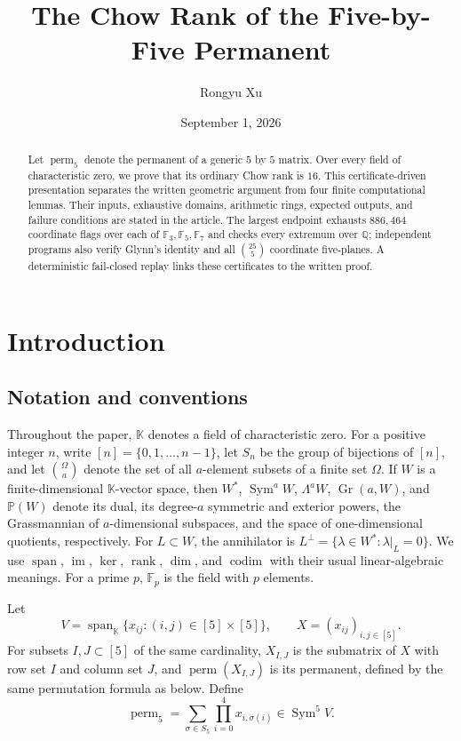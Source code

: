 \documentclass[11pt,reqno]{amsart}
\title{The Chow Rank of the Five-by-Five Permanent}
\author{Rongyu Xu}
\date{September 1, 2026}
\theoremstyle{definition}
\newcommand{\K}{\mathbb K}
\newcommand{\Q}{\mathbb Q}
\newcommand{\F}{\mathbb F}
\newcommand{\Sym}{\operatorname{Sym}}
\newcommand{\rank}{\operatorname{rank}}
\newcommand{\im}{\operatorname{im}}
\newcommand{\Span}{\operatorname{span}}
\newcommand{\perm}{\operatorname{perm}}
\newcommand{\Gr}{\operatorname{Gr}}
\begin{document}
\begin{abstract}
Let \(\perm_5\) denote the permanent of a generic \(5\) by \(5\) matrix.
Over every field of characteristic zero, we prove that its ordinary Chow rank
is \(16\). This certificate-driven presentation separates the written
geometric argument from four finite computational lemmas. Their inputs,
exhaustive domains, arithmetic rings, expected outputs, and failure conditions
are stated in the article. The largest endpoint exhausts \(886{,}464\)
coordinate flags over each of \(\F_3,\F_5,\F_7\) and checks every extremum over
\(\Q\); independent programs also verify Glynn's identity and all
\(\binom{25}{5}\) coordinate five-planes. A deterministic fail-closed replay
links these certificates to the written proof.
\end{abstract}

\maketitle

\section{Introduction}

\subsection*{Notation and conventions}

Throughout the paper, \(\K\) denotes a field of characteristic zero. For a
positive integer \(n\), write \([n]=\{0,1,\ldots,n-1\}\), let \(S_n\) be the
group of bijections of \([n]\), and let \(\binom{\Omega}{a}\) denote the set
of all \(a\)-element subsets of a finite set \(\Omega\). If \(W\) is a
finite-dimensional \(\K\)-vector space, then \(W^*\), \(\Sym^aW\),
\(\Lambda^aW\), \(\Gr(a,W)\), and \(\mathbb P(W)\) denote its dual, its
degree-\(a\) symmetric and exterior powers, the Grassmannian of
\(a\)-dimensional subspaces, and the space of one-dimensional quotients,
respectively. For \(L\subset W\), the annihilator is
\(L^\perp=\{\lambda\in W^*: \lambda|_L=0\}\). We use \(\Span\), \(\im\),
\(\ker\), \(\rank\), \(\dim\), and \(\operatorname{codim}\) with their usual
linear-algebraic meanings. For a prime \(p\), \(\F_p\) is the field with
\(p\) elements.

Let
\[
 V=\Span_{\K}\{x_{ij}:(i,j)\in[5]\times[5]\},
 \qquad X=(x_{ij})_{i,j\in[5]}.
\]
For subsets \(I,J\subset[5]\) of the same cardinality, \(X_{I,J}\) is the
submatrix of \(X\) with row set \(I\) and column set \(J\), and
\(\perm(X_{I,J})\) is its permanent, defined by the same permutation formula
as below. Define
\[
 \perm_5=\sum_{\sigma\in S_5}\prod_{i=0}^4x_{i,\sigma(i)}\in\Sym^5V.
\]
\end{document}
